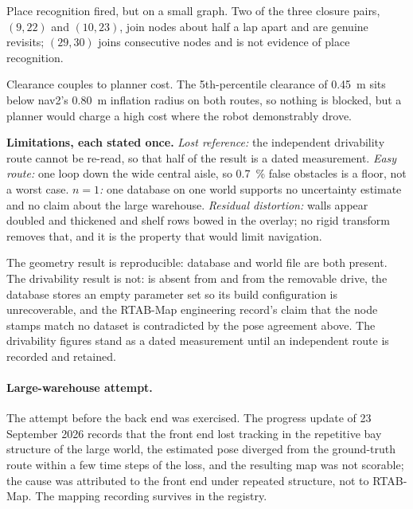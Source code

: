 \documentclass[11pt,a4paper,notitlepage]{report}
\begin{document}
Place recognition fired, but on a small graph. Two of the three closure pairs,
$(9,22)$ and $(10,23)$, join nodes about half a lap apart and are genuine
revisits; $(29,30)$ joins consecutive nodes and is not evidence of place
recognition.

Clearance couples to planner cost. The 5th-percentile clearance of
\SI{0.45}{\metre} sits below nav2's \SI{0.80}{\metre} inflation radius on both
routes, so nothing is blocked, but a planner would charge a high cost where the
robot demonstrably drove.

\textbf{Limitations, each stated once.} \emph{Lost reference:} the independent
drivability route cannot be re-read, so that half of the result is a dated
measurement. \emph{Easy route:} one loop down the wide central aisle, so
\SI{0.7}{\percent} false obstacles is a floor, not a worst case. \emph{$n=1$:}
one database on one world supports no uncertainty estimate and no claim about
the large warehouse. \emph{Residual distortion:} walls appear doubled and
thickened and shelf rows bowed in the overlay; no rigid transform removes that,
and it is the property that would limit navigation.

\begin{queried}
The geometry result is reproducible: database and world file are both present.
The drivability result is not:  is absent from
 and from the removable drive, the database stores an empty
parameter set so its build configuration is unrecoverable, and the RTAB-Map
engineering record's claim that the node stamps match no dataset is
contradicted by the pose agreement above. The drivability figures stand as a
dated measurement until an independent route is recorded and retained.
\end{queried}

\paragraph{Large-warehouse attempt.} The attempt  before the
back end was exercised. The progress update of 23 September 2026 records that
the front end lost tracking in the repetitive bay structure of the large world,
the estimated pose diverged from the ground-truth route within a few time steps
of the loss, and the resulting map was not scorable; the cause was attributed to
the front end under repeated structure, not to RTAB-Map. The mapping recording
 survives in the registry.
\end{document}
